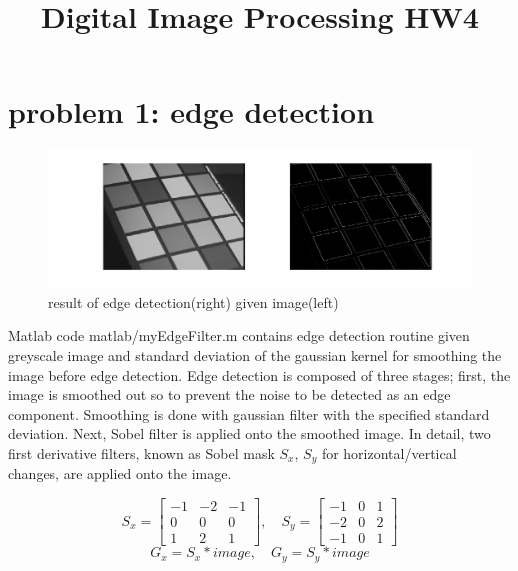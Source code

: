 \documentclass[extendedabs]{bmvc2k}
\begin{document}
\title{Digital Image Processing HW4}

\maketitle
\vspace{-0.2in}

\section*{problem 1: edge detection}

\begin{figure}[h]
    \centering
    \includegraphics[width=\linewidth]{hw4_1_1}
    \caption{result of edge detection(right) given image(left)}
    \label{fig:1}
\end{figure}

Matlab code matlab/myEdgeFilter.m contains edge detection routine given greyscale image and standard deviation
of the gaussian kernel for smoothing the image before edge detection. Edge detection is composed of three stages;
first, the image is smoothed out so to prevent the noise to be detected as an edge component. Smoothing is done with
gaussian filter with the specified standard deviation. Next, Sobel filter is applied onto the smoothed image. In detail,
two first derivative filters, known as Sobel mask $S_x$, $S_y$ for horizontal/vertical changes, are applied onto the image. 

\[S_x = \begin{bmatrix}-1 & -2 & -1\\ 0 & 0 & 0\\ 1 & 2 & 1\end{bmatrix} , \quad
S_y = \begin{bmatrix}-1 & 0 & 1\\ -2 & 0 & 2\\ -1 & 0 & 1\end{bmatrix}\]
\[G_x = S_x \ast image , \quad G_y = S_y \ast image\]
\end{document}
